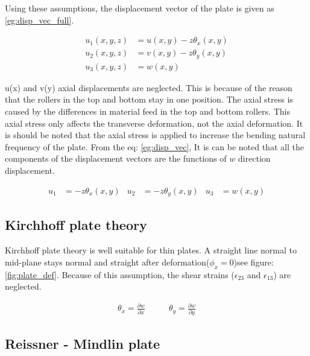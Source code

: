 \documentclass[main.tex]{subfiles}
\begin{document}
 Using these assumptions, the displacement vector of the plate is given as \ref{eg:disp_vec_full}.

 \begin{align}\label{eg:disp_vec_full}
u_1 \left( x, y ,z\right) & =  u \left( x ,y\right) - z \theta_x \left(x,y\right) \\
u_2 \left( x, y ,z\right) & =  v \left( x, y \right) - z \theta_y \left(x,y\right)\\
u_3 \left( x, y ,z\right) & =  w \left(x, y \right) 
\end{align}

 u(x) and v(y) axial displacements are  neglected. This is because of the reason that the rollers in the top and bottom stay in one position. The axial stress is caused by the differences in material feed in the top and bottom rollers. This axial stress only affects the transverse deformation, not the axial deformation. It is should be noted that the axial stress is applied to increase the bending natural frequency of the plate. From the eq: \ref{eg:disp_vec}, It is can be noted that all the components of the displacement vectors are the functions of $w$ direction displacement. 

\begin{align}\label{eg:disp_vec}
u_1  & =  - z \theta_x \left(x,y\right) &
u_2  & =  - z \theta_y \left(x,y\right) &
u_3  & =  w \left(x, y \right) 
\end{align}

 
 \subsection{Kirchhoff plate theory}
 
 Kirchhoff plate theory is well suitable for thin plates. A straight line normal to mid-plane stays normal and straight after deformation($\phi_x=0$)see figure:\ref{fig:plate_def}.  Because of this assumption, the shear strains ($\epsilon_{23}$ and $ \epsilon_{13}$)  are neglected.


\begin{align}
\theta_x  = \frac{\partial w }{\partial x}  \quad & \quad
\theta_y  = \frac{\partial w }{\partial y} 
\end{align}



\subsection{Reissner - Mindlin plate}
\end{document}
